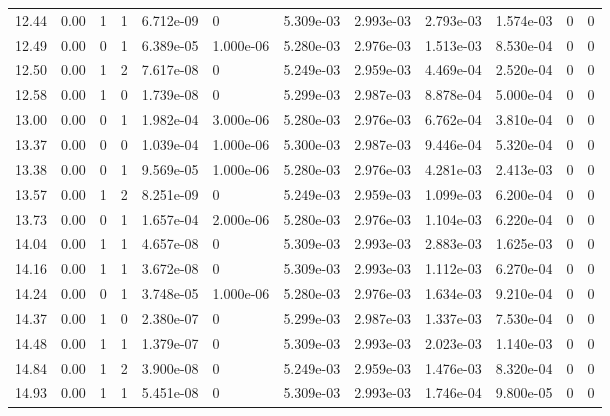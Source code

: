 \documentclass[preview]{standalone}
\begin{document}
{{{\begin{tabular}{L{1.2cm}C{1.2cm} C{0.3cm}C{0.5cm} C{1.4cm}C{1.4cm} C{1.4cm}C{1.4cm} C{1.6cm}C{1.6cm} C{1.6cm}C{1.6cm}}
  12.44  &  0.00  & 1     &  1 &  6.712e-09  & 0  &  5.309e-03&   2.993e-03& 2.793e-03 & 1.574e-03   &  0 & 0  \\ 
  12.49  &  0.00  & 0     &  1 &  6.389e-05  & 1.000e-06  &  5.280e-03&   2.976e-03& 1.513e-03 & 8.530e-04   &  0 & 0  \\ 
  12.50  &  0.00  & 1     &  2 &  7.617e-08  & 0  &  5.249e-03&   2.959e-03& 4.469e-04 & 2.520e-04   &  0 & 0  \\ 
  12.58  &  0.00  & 1     &  0 &  1.739e-08  & 0  &  5.299e-03&   2.987e-03& 8.878e-04 & 5.000e-04   &  0 & 0  \\ 
  13.00  &  0.00  & 0     &  1 &  1.982e-04  & 3.000e-06  &  5.280e-03&   2.976e-03& 6.762e-04 & 3.810e-04   &  0 & 0  \\ 
  13.37  &  0.00  & 0     &  0 &  1.039e-04  & 1.000e-06  &  5.300e-03&   2.987e-03& 9.446e-04 & 5.320e-04   &  0 & 0  \\ 
  13.38  &  0.00  & 0     &  1 &  9.569e-05  & 1.000e-06  &  5.280e-03&   2.976e-03& 4.281e-03 & 2.413e-03   &  0 & 0  \\ 
  13.57  &  0.00  & 1     &  2 &  8.251e-09  & 0  &  5.249e-03&   2.959e-03& 1.099e-03 & 6.200e-04   &  0 & 0  \\ 
  13.73  &  0.00  & 0     &  1 &  1.657e-04  & 2.000e-06  &  5.280e-03&   2.976e-03& 1.104e-03 & 6.220e-04   &  0 & 0  \\ 
  14.04  &  0.00  & 1     &  1 &  4.657e-08  & 0  &  5.309e-03&   2.993e-03& 2.883e-03 & 1.625e-03   &  0 & 0  \\ 
  14.16  &  0.00  & 1     &  1 &  3.672e-08  & 0  &  5.309e-03&   2.993e-03& 1.112e-03 & 6.270e-04   &  0 & 0  \\ 
  14.24  &  0.00  & 0     &  1 &  3.748e-05  & 1.000e-06  &  5.280e-03&   2.976e-03& 1.634e-03 & 9.210e-04   &  0 & 0  \\ 
  14.37  &  0.00  & 1     &  0 &  2.380e-07  & 0  &  5.299e-03&   2.987e-03& 1.337e-03 & 7.530e-04   &  0 & 0  \\ 
  14.48  &  0.00  & 1     &  1 &  1.379e-07  & 0  &  5.309e-03&   2.993e-03& 2.023e-03 & 1.140e-03   &  0 & 0  \\ 
  14.84  &  0.00  & 1     &  2 &  3.900e-08  & 0  &  5.249e-03&   2.959e-03& 1.476e-03 & 8.320e-04   &  0 & 0  \\ 
  14.93  &  0.00  & 1     &  1 &  5.451e-08  & 0  &  5.309e-03&   2.993e-03& 1.746e-04 & 9.800e-05   &  0 & 0  \\ 
\hline 
\end{tabular} 

}}}
\end{document}
